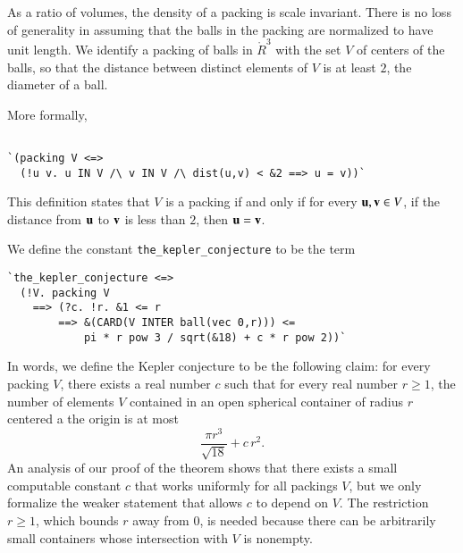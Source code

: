 As a ratio of volumes, the density of a packing is scale invariant.   There is no loss of generality in assuming that
the balls in the packing are normalized
to have unit length.
We identify a packing of balls in $\ring{R}^3$ with the set $V$ of centers of the balls,
so that the distance between distinct elements of $V$ is at least $2$, the diameter of a ball.

More formally,

\begin{obeylines}

\begin{verbatim}

`(packing V <=> 
  (!u v. u IN V /\ v IN V /\ dist(u,v) < &2 ==> u = v))`

\end{verbatim}
\end{obeylines}
This definition states that $V$ is a packing if and only if for every ${\mathbf u}, {\mathbf v} \in V$, if
the distance from ${\mathbf u}$ to ${\mathbf v}$ is less than $2$, then ${\mathbf u}={\mathbf v}$.

We define the constant {\tt the\_kepler\_conjecture} to be the term

\begin{obeylines}

\begin{verbatim}
`the_kepler_conjecture <=>
  (!V. packing V
    ==> (?c. !r. &1 <= r
        ==> &(CARD(V INTER ball(vec 0,r))) <=
            pi * r pow 3 / sqrt(&18) + c * r pow 2))`
\end{verbatim}
\end{obeylines}

In words, we define the Kepler conjecture to be the following claim:
for every packing $V$, there exists a real number $c$ such that for every real number $r\ge 1$, the number
of elements $V$ contained in an open spherical container of radius $r$ centered a the origin is at most
\[
  \frac{\pi r^3}{\sqrt{18}} + c\, r^2.
\]
An analysis of our proof of the theorem shows that there exists a small computable constant $c$ that works uniformly
for all packings $V$,
but we only formalize the weaker statement that allows $c$ to depend on $V$.
The restriction $r\ge 1$, which bounds $r$ away from $0$,
is needed because there can be arbitrarily small containers whose intersection with $V$ is nonempty.

